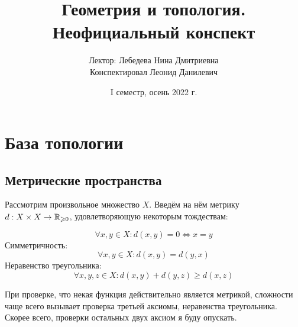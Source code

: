 \documentclass[a4paper]{report}
\date{I семестр, осень 2022 г.}
\title{Геометрия и топология. Неофициальный конспект}
\author{Лектор: Лебедева Нина Дмитриевна \\ Конспектировал Леонид Данилевич}
\begin{document}
    \maketitle
    \tableofcontents
    \newpage
    \setcounter{lection}{0}


    \chapter{База топологии}


    \section{Метрические пространства}
    Рассмотрим произвольное множество $X$.
    Введём на нём метрику $d: X \times X \rightarrow \mathbb{R}_{\geqslant 0}$, удовлетворяющую некоторым тождествам:

    \begin{equation}
        \forall x, y \in X: d(x, y) = 0 \iff x = y
    \end{equation}
    Симметричность:
    \begin{equation}
        \forall x, y \in X: d(x, y) = d(y, x)
    \end{equation}
    Неравенство треугольника:
    \begin{equation}
        \forall x, y, z \in X: d(x, y) + d(y, z) \ge d(x, z)
    \end{equation}

    При проверке, что некая функция действительно является метрикой, сложности чаще всего вызывает проверка третьей аксиомы, неравенства треугольника.
    Скорее всего, проверки остальных двух аксиом я буду опускать.
\end{document}
